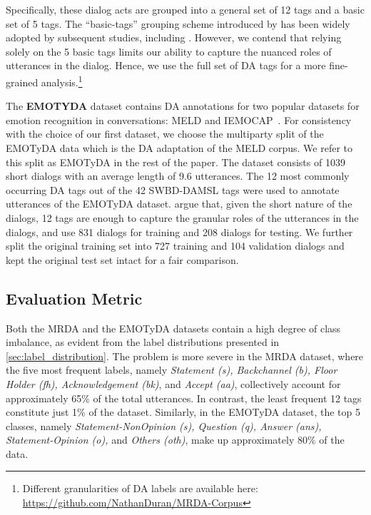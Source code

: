 Specifically, these dialog acts are grouped into a general set of 12 tags and a basic set of 5 tags.
The ``basic-tags'' grouping scheme introduced by \cite{Ang2005AutomaticDA} has been widely adopted by subsequent studies, including \cite{ortega-vu-2017-neural, li-etal-2019-dual, raheja-tetreault-2019-dialogue, he-etal-2021-speaker-turn}.
However, we contend that relying solely on the 5 basic tags limits our ability to capture the nuanced roles of utterances in the dialog.
Hence, we use the full set of DA tags for a more fine-grained analysis.\footnote{Different granularities of DA labels are available here: \url{https://github.com/NathanDuran/MRDA-Corpus}}

The \textbf{EMOTYDA} dataset contains DA annotations for two popular datasets for emotion recognition in conversations: MELD \cite{poria-etal-2019-meld} and IEMOCAP~\cite{article2}.
For consistency with the choice of our first dataset, we choose the multiparty split of the EMOTyDA data which is the DA adaptation of the MELD corpus.
We refer to this split as EMOTyDA in the rest of the paper.
The dataset consists of 1039 short dialogs with an average length of 9.6 utterances.
The 12 most commonly occurring DA tags out of the 42 SWBD-DAMSL \cite{Jurafsky1997SwitchboardSS} tags were used to annotate utterances of the EMOTyDA dataset.
\cite{saha-etal-2020-towards} argue that, given the short nature of the dialogs, 12 tags are enough to capture the granular roles of the utterances in the dialogs, and use 831 dialogs for training and 208 dialogs for testing.
We further split the original training set into 727 training and 104 validation dialogs and kept the original test set intact for a fair comparison.

\subsection{Evaluation Metric}

Both the MRDA and the EMOTyDA datasets contain a high degree of class imbalance, as evident from the label distributions presented in \autoref{sec:label_distribution}.
The problem is more severe in the MRDA dataset, where the five most frequent labels, namely \textit{Statement (s), Backchannel (b), Floor Holder (fh), Acknowledgement (bk)}, and  \textit{Accept (aa)}, collectively account for approximately 65\% of the total utterances.
In contrast, the least frequent 12 tags constitute just 1\% of the dataset.
Similarly, in the EMOTyDA dataset, the top 5 classes, namely \textit{Statement-NonOpinion (s), Question (q), Answer (ans), Statement-Opinion (o),} and \textit{Others (oth)}, make up approximately 80\% of the data.

